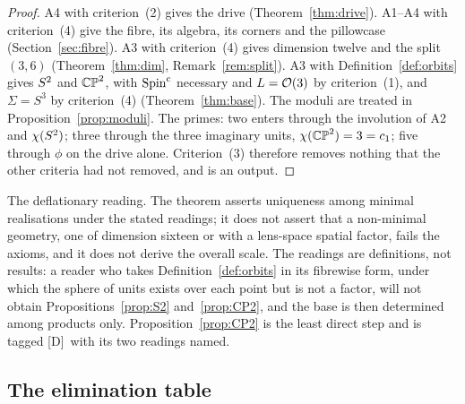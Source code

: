 \documentclass[11pt,a4paper]{article}
\theoremstyle{plain}
\theoremstyle{definition}
\theoremstyle{remark}
\newcommand{\rigD}{[\textup{D}]}
\begin{document}
\begin{proof}
A4 with criterion~(2) gives the drive (Theorem~\ref{thm:drive}). A1--A4 with criterion~(4) give the fibre, its algebra, its corners and the pillowcase (Section~\ref{sec:fibre}). A3 with criterion~(4) gives dimension twelve and the split $(3,6)$ (Theorem~\ref{thm:dim}, Remark~\ref{rem:split}). A3 with Definition~\ref{def:orbits} gives $S^2$ and $\mathbb{CP}^2$, with $\text{Spin}^c$ necessary and $L=\mathcal{O}(3)$ by criterion~(1), and $\Sigma=S^{3}$ by criterion~(4) (Theorem~\ref{thm:base}). The moduli are treated in Proposition~\ref{prop:moduli}. The primes: two enters through the involution of A2 and $\chi(S^2)$; three through the three imaginary units, $\chi(\mathbb{CP}^2)=3=c_{1}$; five through $\phi$ on the drive alone. Criterion~(3) therefore removes nothing that the other criteria had not removed, and is an output.
\end{proof}

The deflationary reading. The theorem asserts uniqueness among minimal realisations under the stated readings; it does not assert that a non-minimal geometry, one of dimension sixteen or with a lens-space spatial factor, fails the axioms, and it does not derive the overall scale. The readings are definitions, not results: a reader who takes Definition~\ref{def:orbits} in its fibrewise form, under which the sphere of units exists over each point but is not a factor, will not obtain Propositions~\ref{prop:S2} and~\ref{prop:CP2}, and the base is then determined among products only. Proposition~\ref{prop:CP2} is the least direct step and is tagged \rigD\ with its two readings named.

\subsection{The elimination table}
\end{document}

